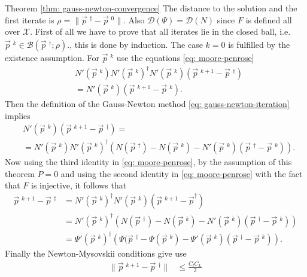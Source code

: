 \begin{myproof}{Theorem \ref{thm: gauss-newton-convergence}}
    \label{proof: thm-gauss-newton-convergence}
    The distance to the solution and the first iterate is $\rho =
    \|\vec{p}\;^{\dagger} - \vec{p}\;^{0}\|$. Also $\mathcal{D}(\Psi) =
    \mathcal{D}(N)$ since $F$ is defined all over $\mathcal{X}$. First of all
    we have to prove that all iterates lie in the closed ball, i.e.
    $\vec{p}\;^{k} \in \overline{\mathcal{B}(\vec{p}\;^{\dagger}; \rho)}$.,
    this is done by induction. The case $k=0$ is fulfilled by the existence assumption.
    For $\vec{p}\;^{k}$ use the equations \ref{eq: moore-penrose}
    \begin{align}
        &N'(\vec{p}\;^{k})N'(\vec{p}\;^{k})^{\dagger}N'(\vec{p}\;^{k})
        \left(\vec{p}\;^{k+1} - \vec{p}\;^{\dagger}  \right)\\
        &= N'(\vec{p}\;^{k})(\vec{p}\;^{k+1} - \vec{p}\;^{k}).
    \end{align}
    Then the definition of the Gauss-Newton method
    \ref{eq: gauss-newton-iteration} implies
    \begin{align}
        &N'(\vec{p}\;^{k})(\vec{p}\;^{k+1}-\vec{p}\;^{\dagger}) =\\
        &=N'(\vec{p}\;^{k})N'(\vec{p}\;^{k})^{\dagger}\left(
        N(\vec{p}\;^{\dagger})-N(\vec{p}\;^{k})
        - N'(\vec{p}\;^{k})(\vec{p}\;^{\dagger} - \vec{p}\;^{k})\right) .
    \end{align}
    Now using the third identity in \ref{eq: moore-penrose}, by the assumption
    of this theorem $P = 0$ and using the second identity in
    \ref{eq: moore-penrose} with the fact that $F$ is injective, it follows
    that
    \begin{align}
        \vec{p}\;^{k+1} - \vec{p}\;^{\dagger}
        &=
        N'(\vec{p}\;^{k})^{\dagger}N'(\vec{p}\;^{k})(\vec{p}\;^{k+1} -
        \vec{p}^{\dagger}) \\
        &=
        N'(\vec{p}\;^{k})^{\dagger}\left(N(\vec{p}\;^{\dagger})-N(\vec{p}\;^{k})
        - N'(\vec{p}\;^{k})(\vec{p}\;^{\dagger} - \vec{p}\;^{k}) \right) \\
        &= \Psi'(\vec{p}\;^{k})^{\dagger}\left(\Psi(\vec{p}\;^{\dagger}-
        \Psi(\vec{p}\;^{k}) -
    \Psi'(\vec{p}\;^{k})(\vec{p}\;^{\dagger}-\vec{p}\;^{k}) \right).
    \end{align}
    Finally the Newton-Mysovskii conditions give use
    \begin{align}
        \|\vec{p}\;^{k+1} - \vec{p}\;^{\dagger}\|
        &\le \frac{C_lC_L}{2}

\end{align}
\end{myproof}
